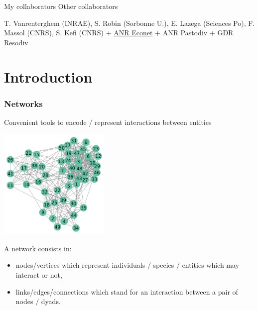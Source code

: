 \documentclass[compress,10pt]{beamer}
\begin{document}
\begin{frame}{My collaborators}
\bigskip
\alert{Other collaborators} 

 


T. Vanrenterghem (INRAE), S. Robin (Sorbonne U.),  E. Lazega (Sciences Po),  F. Massol (CNRS), S. Kefi (CNRS) +  \href{https://cmatias.perso.math.cnrs.fr/ANR_EcoNet.html}{ANR Econet} + ANR Pastodiv + GDR Resodiv





\end{frame}


  

\section{Introduction}


\begin{frame} \frametitle{Networks }

Convenient tools to encode / represent interactions between entities

\begin{center}
\includegraphics[width=0.4\textwidth]{plots/network_raw.png}
\end{center}


 A network consists in:
 \begin{itemize}
  \item \alert{nodes/vertices} which represent individuals / species / entities which may interact or not,
  \item \alert{links/edges/connections} which stand for an interaction between a pair of nodes / dyads.
  
 \end{itemize}
 
 \end{frame}
 
\end{document}

